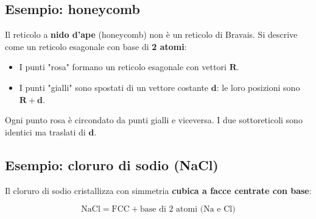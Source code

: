\vspace{0.5cm}
\begin{center}
\end{center}
\vspace{0.2cm}

\subsection*{Esempio: honeycomb}

Il reticolo a \textbf{nido d'ape} (honeycomb) non è un reticolo di Bravais. Si descrive come un reticolo esagonale con base di \textbf{2 atomi}:

\begin{itemize}
    \item I punti "rosa" formano un reticolo esagonale con vettori $\mathbf{R}$.
    \item I punti "gialli" sono spostati di un vettore costante $\mathbf{d}$: le loro posizioni sono $\mathbf{R} + \mathbf{d}$.
\end{itemize}

Ogni punto rosa è circondato da punti gialli e viceversa. I due sottoreticoli sono identici ma traslati di $\mathbf{d}$.

\subsection*{Esempio: cloruro di sodio (NaCl)}

Il cloruro di sodio cristallizza con simmetria \textbf{cubica a facce centrate con base}:

$$\text{NaCl} = \text{FCC} + \text{base di 2 atomi (Na e Cl)}$$

